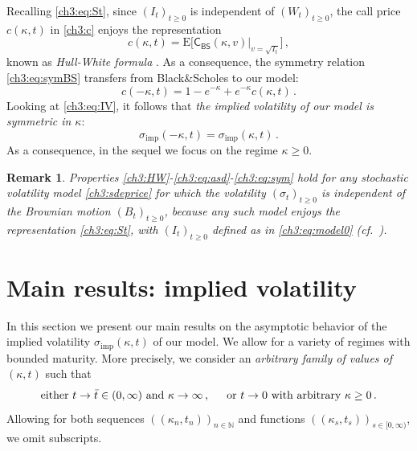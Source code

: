 \documentclass[a4paper,reqno,11pt]{amsart}
\numberwithin{equation}{section}
\newtheorem{remark}[theorem]{Remark}
\newcommand{\N}{\mathbb{N}}
\newcommand{\PEfont}{\mathrm}
\newcommand{\E}{\ensuremath{\PEfont E}}
\newcommand\CBS{\mathsf{C_{BS}}}
\newcommand\imp{\mathrm{imp}}
\begin{document}
Recalling \eqref{ch3:eq:St}, since $(I_t)_{t\ge 0}$ is independent of $(W_t)_{t\ge 0}$, the call price
$c(\kappa,t)$ in \eqref{ch3:c} enjoys the representation
\begin{equation} \label{ch3:HW}
	c(\kappa,t) = \E \big[ \CBS(\kappa, v)
	\big|_{v = \sqrt{I_t}} \big] \,,
\end{equation}
known as \emph{Hull-White formula} \cite{cf:HW}.
As a consequence, the symmetry relation \eqref{ch3:eq:symBS} transfers from Black\&Scholes to our model:
\begin{equation} \label{ch3:eq:asd}
	c(-\kappa,t) = 1-e^{-\kappa}  + e^{-\kappa} c(\kappa,t) \,.
\end{equation}
Looking at \eqref{ch3:eq:IV}, it follows that \emph{the implied volatility
of our model is symmetric in $\kappa$}:
\begin{equation} \label{ch3:eq:sym}
	\sigma_\imp(-\kappa,t) = \sigma_\imp(\kappa,t) \,.
\end{equation}
As a consequence, in the sequel we focus on the regime $\kappa \ge 0$.

\begin{remark}\rm\label{ch3:rem:shared}
Properties \eqref{ch3:HW}-\eqref{ch3:eq:asd}-\eqref{ch3:eq:sym}
hold for \emph{any} stochastic volatility model \eqref{ch3:sdeprice}
for which the volatility $(\sigma_t)_{t\ge 0}$ is independent of the Brownian motion
$(B_t)_{t\ge 0}$, because any such model enjoys the representation \eqref{ch3:eq:St},
with $(I_t)_{t\ge 0}$ defined as in \eqref{ch3:eq:model0}
(cf.\ \cite{cf:RT}).
\end{remark}






\section{Main results: implied volatility}
\label{ch3:sec:impvol}

In this section we present our main results on
the asymptotic behavior of the implied volatility $\sigma_\imp(\kappa,t)$
of our model. We allow for a variety of regimes with bounded maturity.
More precisely, we consider an \emph{arbitrary family of values of $(\kappa,t)$} such that
\begin{equation}\label{ch3:eq:assfamily}
	\text{either $t \to \bar t \in (0,\infty)$ and $\kappa \to \infty$\,,
	\quad \
	or $t \to 0$ with arbitrary $\kappa \ge 0$} \,.
\end{equation}
Allowing for both sequences $((\kappa_n,t_n))_{n\in\N}$
and functions $((\kappa_s,t_s))_{s\in [0,\infty)}$, we omit subscripts.
\end{document}
